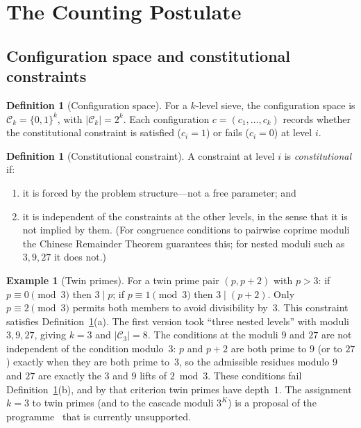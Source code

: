 \documentclass[12pt]{amsart}
\theoremstyle{plain}
\theoremstyle{definition}
\newtheorem{definition}[theorem]{Definition}
\newtheorem{example}[theorem]{Example}
\theoremstyle{remark}
\begin{document}
\section{The Counting Postulate}
\label{sec:combinatorial}

\subsection{Configuration space and constitutional constraints}

\begin{definition}[Configuration space]
\label{def:config}
For a $k$-level sieve, the configuration space is $\mathcal{C}_k = \{0,1\}^k$,
with $|\mathcal{C}_k| = 2^k$. Each configuration $c = (c_1, \ldots, c_k)$
records whether the constitutional constraint is satisfied ($c_i = 1$) or fails
($c_i = 0$) at level $i$.
\end{definition}

\begin{definition}[Constitutional constraint]
\label{def:constitutional}
A constraint at level $i$ is \emph{constitutional} if:
\begin{enumerate}[label=(\alph*)]
  \item it is forced by the problem structure---not a free parameter; and
  \item it is independent of the constraints at the other levels, in the sense
    that it is not implied by them. (For congruence conditions to pairwise
    coprime moduli the Chinese Remainder Theorem guarantees this; for nested
    moduli such as $3, 9, 27$ it does not.)
\end{enumerate}
\end{definition}

\begin{example}[Twin primes]
\label{ex:twin}
For a twin prime pair $(p, p+2)$ with $p > 3$: if $p \equiv 0 \pmod{3}$ then
$3 \mid p$; if $p \equiv 1 \pmod{3}$ then $3 \mid (p+2)$. Only $p \equiv 2
\pmod{3}$ permits both members to avoid divisibility by~$3$. This constraint
satisfies Definition~\ref{def:constitutional}(a). The first version took
``three nested levels'' with moduli $3, 9, 27$, giving $k = 3$ and
$|\mathcal{C}_3| = 8$. The conditions at the moduli $9$ and $27$ are not
independent of the condition modulo~$3$: $p$ and $p+2$ are both prime to $9$
(or to $27$) exactly when they are both prime to~$3$, so the admissible residues
modulo $9$ and $27$ are exactly the $3$ and $9$ lifts of $2 \bmod 3$. These
conditions fail Definition~\ref{def:constitutional}(b), and by that criterion
twin primes have depth~$1$. The assignment $k = 3$ to twin primes (and to the
cascade moduli $3^K$) is a proposal of the
programme~\cite{WakilCF,WakilEisenstein} that is currently unsupported.
\end{example}
\end{document}
